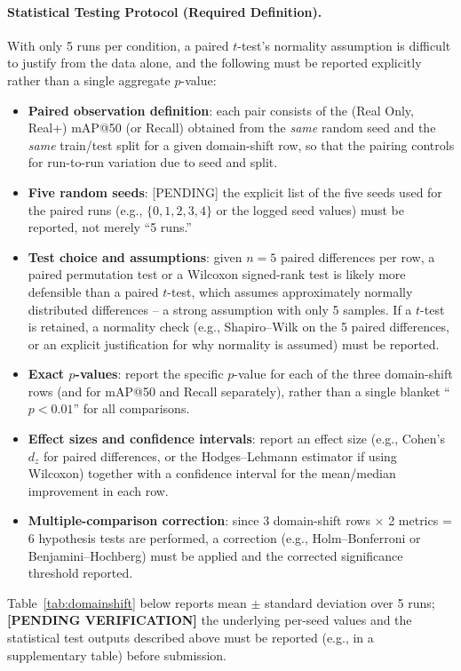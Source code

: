 \documentclass[journal]{IEEEtran}
\begin{document}
\paragraph{Statistical Testing Protocol (Required Definition).}
\label{sec:stats_protocol}
With only 5 runs per condition, a paired $t$-test's normality assumption is
difficult to justify from the data alone, and the following must be
reported explicitly rather than a single aggregate $p$-value:
\begin{itemize}
    \item \textbf{Paired observation definition}: each pair consists of
    the (Real Only, Real+\method) mAP@50 (or Recall) obtained from the
    \emph{same} random seed and the \emph{same} train/test split for a
    given domain-shift row, so that the pairing controls for
    run-to-run variation due to seed and split.
    \item \textbf{Five random seeds}: [PENDING] the explicit list of the
    five seeds used for the paired runs (e.g., $\{0,1,2,3,4\}$ or the
    logged seed values) must be reported, not merely ``5 runs.''
    \item \textbf{Test choice and assumptions}: given $n=5$ paired
    differences per row, a paired permutation test or a Wilcoxon
    signed-rank test is likely more defensible than a paired $t$-test,
    which assumes approximately normally distributed differences -- a
    strong assumption with only 5 samples. If a $t$-test is retained, a
    normality check (e.g., Shapiro--Wilk on the 5 paired differences, or
    an explicit justification for why normality is assumed) must be
    reported.
    \item \textbf{Exact $p$-values}: report the specific $p$-value for
    each of the three domain-shift rows (and for mAP@50 and Recall
    separately), rather than a single blanket ``$p<0.01$'' for all
    comparisons.
    \item \textbf{Effect sizes and confidence intervals}: report an
    effect size (e.g., Cohen's $d_z$ for paired differences, or the
    Hodges--Lehmann estimator if using Wilcoxon) together with a
    confidence interval for the mean/median improvement in each row.
    \item \textbf{Multiple-comparison correction}: since 3 domain-shift
    rows $\times$ 2 metrics = 6 hypothesis tests are performed, a
    correction (e.g., Holm--Bonferroni or Benjamini--Hochberg) must be
    applied and the corrected significance threshold reported.
\end{itemize}
Table~\ref{tab:domainshift} below reports mean $\pm$ standard deviation
over 5 runs; \textbf{[PENDING VERIFICATION]} the underlying per-seed
values and the statistical test outputs described above must be reported
(e.g., in a supplementary table) before submission.
\end{document}
